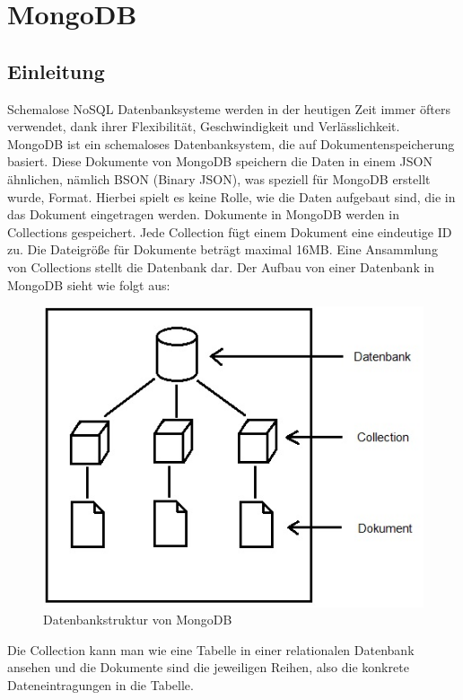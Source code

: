 \section{MongoDB}
\subsection{Einleitung}
Schemalose NoSQL Datenbanksysteme werden in der heutigen Zeit immer öfters verwendet, dank ihrer Flexibilität, Geschwindigkeit und Verlässlichkeit. MongoDB ist ein schemaloses Datenbanksystem, die auf Dokumentenspeicherung basiert. Diese Dokumente von MongoDB speichern die Daten in einem JSON ähnlichen, nämlich BSON (Binary JSON), was speziell für MongoDB erstellt wurde, Format. Hierbei spielt es keine Rolle, wie die Daten aufgebaut sind, die in das Dokument eingetragen werden. Dokumente in MongoDB werden in Collections gespeichert. Jede Collection fügt einem Dokument eine eindeutige ID zu.  Die Dateigröße für Dokumente beträgt maximal 16MB. Eine Ansammlung von Collections stellt die Datenbank dar.
Der Aufbau von einer Datenbank in MongoDB sieht wie folgt aus:
\begin{figure}[hbt]
	\centering
	\includegraphics[scale=1]{images/Datenmodell_Mongo.jpg}  
	\caption{Datenbankstruktur von MongoDB}
\end{figure}
Die Collection kann man wie eine Tabelle in einer relationalen Datenbank ansehen und die Dokumente sind die jeweiligen Reihen, also die konkrete Dateneintragungen in die Tabelle.
